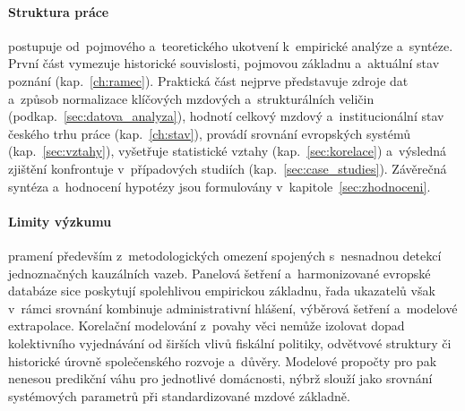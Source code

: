 \paragraph{Struktura práce}\label{par:struktura} postupuje od~pojmového a~teoretického ukotvení k~empirické analýze a~syntéze. První část vymezuje historické souvislosti, pojmovou základnu a~aktuální stav poznání (kap.~\ref{ch:ramec}). Praktická část nejprve představuje zdroje dat a~způsob normalizace klíčových mzdových a~strukturálních veličin (podkap.~\ref{sec:datova_analyza}), hodnotí celkový mzdový a~institucionální stav českého trhu práce (kap.~\ref{ch:stav}), provádí srovnání evropských systémů (kap.~\ref{sec:vztahy}), vyšetřuje statistické vztahy (kap.~\ref{sec:korelace}) a~výsledná zjištění konfrontuje v~případových studiích (kap.~\ref{sec:case_studies}). Závěrečná syntéza a~hodnocení hypotézy jsou formulovány v~kapitole~\ref{sec:zhodnoceni}.

\paragraph{Limity výzkumu}\label{par:limity} pramení především z~metodologických omezení spojených s~nesnadnou detekcí jednoznačných kauzálních vazeb. Panelová šetření a~harmonizované evropské databáze sice poskytují spolehlivou empirickou základnu, řada ukazatelů však v~rámci srovnání kombinuje administrativní hlášení, výběrová šetření a~modelové extrapolace. Korelační modelování z~povahy věci nemůže izolovat dopad kolektivního vyjednávání od širších vlivů fiskální politiky, odvětvové struktury či historické úrovně společenského rozvoje a~důvěry. Modelové propočty pro  pak nenesou predikční váhu pro jednotlivé domácnosti, nýbrž slouží jako srovnání systémových parametrů při standardizované mzdové základně.
